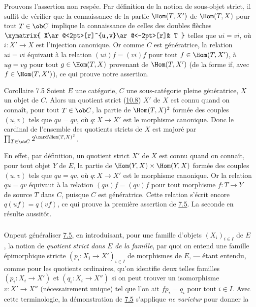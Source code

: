 Prouvons l'assertion non respée. Par définition de la notion de
sous-objet strict, il suffit de vérifier que la connaissance de la
partie $\Hom(T,X')$ de $\Hom(T,X)$ pour tout $T\in\ob C$ implique la
connaissance de celles des doubles flèches $\xymatrix{
X\ar@<2pt>[r]^{u,v}\ar@<-2pt>[r]& T }$ telles que $ui=vi$, où
$i:X'\rightarrow X$ est l'injection canonique. Or comme $C$ est
génératrice, la relation $ui=vi$ équivaut à la relation
$(ui)f=(vi)f$ pour tout $f\in \Hom(T,X')$, \ie à $ug=vg$ pour tout
$g\in \Hom(T,X)$ provenant de $\Hom(T,X')$ (\ie de la forme if, avec
$f\in \Hom(T,X')$), ce qui prouve notre assertion.

\begin{enonce*}{Corollaire 7.5}
Soient $E$ une catégorie, $C$ une sous-catégorie pleine
génératrice,
$X$ un objet de $C$. Alors un quotient strict (\hyperref[I.sec10.8]{10.8}) $X'$ de $X$
est connu quand on connaît, pour tout $T\in \ob C$, la partie de
$\Hom(T,X)^2$ formée des couples $(u,v)$ tels que $qu=qv$, où
$q:X\rightarrow X'$ est le morphisme canonique. Donc le cardinal de
l'ensemble des quotients stricts de $X$ est majoré par $\prod_{T\in
\ob C} 2^{\card\Hom(T,X)^2}$.
\end{enonce*}

En effet, par %
définition, un quotient strict $X'$ de $X$ est connu quand on
connaît, pour tout objet $Y$ de $E$, la partie de $\Hom(Y,X)\times
\Hom(Y,X)$ formée des couples $(u,v)$ tels que $qu=qv$, où
$q:X\rightarrow X'$ est le morphisme canonique. Or la relation
$qu=qv$ équivaut à la relation $(qu)f=(qv)f$ pour tout morphisme
$f:T\rightarrow Y$ de source $T$ dans $C$, puisque $C$ est
génératrice. Cette relation s'écrit encore $q(uf)=q(vf)$, ce qui
prouve la première assertion de \hyperref[I.cor7.5]{7.5}. La seconde en
résulte aussitôt.

\setcounter{subsection}{5} \setcounter{subsubsection}{0}
\subsubsection{}
On\pageoriginale peut généraliser \hyperref[I.cor7.5]{7.5}, en
introduisant, pour une
famille d'objets $(X_i)_{i\in I}$ de $E$, la notion de
\emph{quotient
  strict dans $E$ de la famille}, par quoi on entend une famille
épimorphique stricte $(p_i:X_i\rightarrow X')_{i\in I}$ de
morphismes de $E$, --- étant entendu, comme pour les quotients
ordinaires, qu'on identifie deux telles familles
$(p_i:X_i\rightarrow X')$ et $(q_i:X_i\rightarrow X'')$ si on peut
trouver un isomorphisme $v:X'\rightarrow X''$ (nécessairement
unique) tel que l'on ait $fp_i=q_i$ pour tout $i\in I$. Avec cette
terminologie, la démonstration de \hyperref[I.cor7.5]{7.5} s'applique {\it ne
varietur} pour donner la

